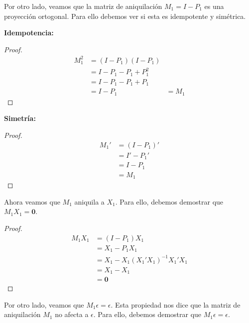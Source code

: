 \documentclass[a4paper, answers, addpoints, 11pt]{exam}
\begin{document}
\begin{enumerate}
\begin{mdframed}
Por otro lado, veamos que la matriz de aniquilación $M_1 = I - P_1$ es una proyección ortogonal. Para ello debemos ver si esta es idempotente y simétrica.

\textbf{Idempotencia:}
\begin{proof}
\begin{align*}
    M_1^2 &= (I - P_1)(I - P_1) \\
    &= I - P_1 - P_1 + P_1^2 \\
    &= I - P_1 - P_1 + P_1 \\
    &= I - P_1
    &= M_1
\end{align*}
\end{proof}

\textbf{Simetría:}
\begin{proof}
\begin{align*}
    M_1' &= (I - P_1)' \\
    &= I' - P_1' \\
    &= I - P_1 \\
    &= M_1
\end{align*}
\end{proof}

\bigskip

                           
Ahora veamos que $M_1$ aniquila a $X_1$. Para ello, debemos demostrar que $M_1X_1 = \boldsymbol{0}$.
\begin{proof}
\begin{align*}
    M_1X_1 &= (I - P_1)X_1 \\
    &= X_1 - P_1X_1 \\
    &= X_1 - X_1(X_1'X_1)^{-1}X_1'X_1 \\
    &= X_1 - X_1 \\
    &= \boldsymbol{0}
\end{align*}
\end{proof}



                           
Por otro lado, veamos que $M_1\epsilon = \epsilon$. Esta propiedad nos dice que la matriz de aniquilación $M_1$ no afecta a $\epsilon$.
Para ello, debemos demostrar que $M_1\epsilon = \epsilon$.


\end{mdframed}
\end{enumerate}
\end{document}
